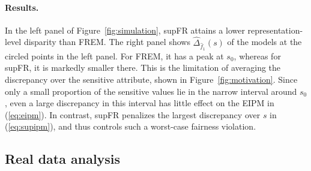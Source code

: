 \documentclass{article} %
\begin{document}
\paragraph{Results.}  In the left panel of Figure~\ref{fig:simulation}, supFR attains a lower representation-level disparity than FREM.
The right panel shows $\widehat{\Delta}_{\hat{f}_1}(s)$ of the models at the circled points in the left panel.
For FREM, it has a peak at $s_0$, whereas for supFR, it is markedly smaller there.
This is the limitation of averaging the discrepancy over the sensitive attribute, shown in Figure~\ref{fig:motivation}. Since only a small proportion of the sensitive values lie in the narrow interval around $s_0$, even a large discrepancy in this interval has little effect on the EIPM in (\ref{eq:eipm}).
In contrast, supFR penalizes the largest discrepancy over $s$ in (\ref{eq:supipm}), and thus controls such a worst-case fairness violation.


\subsection{Real data analysis}
\label{sec:exp-real}
\end{document}
